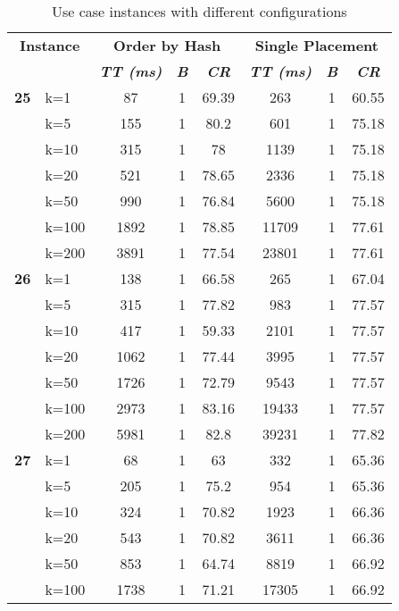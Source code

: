 \begin{table}[htbp]
    \caption{Use case instances with different configurations}
    \begin{tabular}{ll|ccc|ccc}
    
    \multicolumn{ 2}{c|}{\textbf{Instance}} & \multicolumn{ 3}{c|}{\textbf{Order by Hash}} & \multicolumn{ 3}{c}{\textbf{Single Placement}} \\ 
    \multicolumn{ 2}{l|}{} & \textbf{\textit{TT (ms)}} & \textbf{\textit{B}} & \textbf{\textit{CR}} & \textbf{\textit{TT (ms)}} & \textbf{\textit{B}} & \textbf{\textit{CR}} \\ \hline
    \multicolumn{1}{r}{\textbf{25}} & k=1 & 87 & 1 & 69.39 & 263 & 1 & 60.55 \\ 
     & k=5 & 155 & 1 & 80.2 & 601 & 1 & 75.18 \\ 
     & k=10 & 315 & 1 & 78 & 1139 & 1 & 75.18 \\ 
     & k=20 & 521 & 1 & 78.65 & 2336 & 1 & 75.18 \\ 
     & k=50 & 990 & 1 & 76.84 & 5600 & 1 & 75.18 \\ 
     & k=100 & 1892 & 1 & 78.85 & 11709 & 1 & 77.61 \\ 
     & k=200 & 3891 & 1 & 77.54 & 23801 & 1 & 77.61 \\ \hline
    \multicolumn{1}{r}{\textbf{26}} & k=1 & 138 & 1 & 66.58 & 265 & 1 & 67.04 \\ 
     & k=5 & 315 & 1 & 77.82 & 983 & 1 & 77.57 \\ 
     & k=10 & 417 & 1 & 59.33 & 2101 & 1 & 77.57 \\ 
     & k=20 & 1062 & 1 & 77.44 & 3995 & 1 & 77.57 \\ 
     & k=50 & 1726 & 1 & 72.79 & 9543 & 1 & 77.57 \\ 
     & k=100 & 2973 & 1 & 83.16 & 19433 & 1 & 77.57 \\ 
     & k=200 & 5981 & 1 & 82.8 & 39231 & 1 & 77.82 \\ \hline
    \multicolumn{1}{r}{\textbf{27}} & k=1 & 68 & 1 & 63 & 332 & 1 & 65.36 \\ 
     & k=5 & 205 & 1 & 75.2 & 954 & 1 & 65.36 \\ 
     & k=10 & 324 & 1 & 70.82 & 1923 & 1 & 66.36 \\ 
     & k=20 & 543 & 1 & 70.82 & 3611 & 1 & 66.36 \\ 
     & k=50 & 853 & 1 & 64.74 & 8819 & 1 & 66.92 \\ 
     & k=100 & 1738 & 1 & 71.21 & 17305 & 1 & 66.92 \\ 

\end{tabular}
\end{table}
